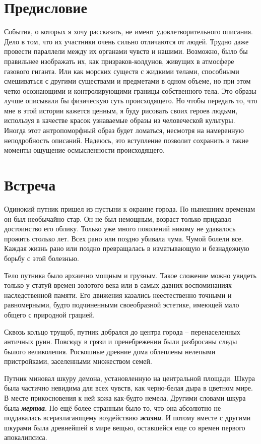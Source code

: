 \documentclass[12pt,a4paper]{article}
\begin{document}
\section*{Предисловие}

События, о которых я хочу рассказать, не имеют удовлетворительного описания. Дело в том, что их участники очень сильно отличаются от людей. Трудно даже провести параллели между их органами чувств и нашими. Возможно, было бы правильнее изображать их, как призраков-колдунов, живущих в атмосфере газового гиганта. Или как морских существ с жидкими телами, способными  смешиваться с другими существами и предметами в одном объеме, но при этом четко осознающими и контролирующими границы собственного тела. Это образы лучше описывали бы физическую суть происходящего. Но чтобы передать то, что мне в этой истории кажется ценным, я буду рисовать своих героев людьми, используя в качестве красок узнаваемые образы из человеческой культуры. Иногда этот антропоморфный образ будет ломаться, несмотря на намеренную неподробность описаний. Надеюсь, это вступление позволит сохранить в такие моменты ощущение осмысленности происходящего.

\section*{Встреча}

Одинокий путник пришел из пустыни к окраине города. По нынешним временам он был необычайно стар. Он не был немощным, возраст только придавал достоинство его облику. Только уже много поколений никому не удавалось прожить столько лет. Всех рано или поздно убивала чума. Чумой болели все. Каждая жизнь рано или поздно превращалась в изматывающую и безнадежную борьбу с этой болезнью.

Тело путника было архаично мощным и грузным. Такое сложение можно увидеть только у статуй времен золотого века или в самых давних воспоминаниях наследственной памяти. Его движения казались неестественно точными и равномерными, будто подчиненными своеобразной эстетике, имеющей мало общего с природной грацией.

Сквозь кольцо трущоб, путник добрался до центра города -- перенаселенных античных руин. Повсюду в грязи и пренебрежении были разбросаны следы былого великолепия. Роскошные древние дома облеплены нелепыми пристройками, заселенными множеством семей.

Путник миновал шкуру демона, установленную на центральной площади. Шкура была частично невидима для всех чувств, как черно-белая дыра в цветном мире. В месте прикосновения к ней кожа как-будто немела. Другими словами шкура была \textbf{\textit{мертва}}. Но ещё более странным было то, что она абсолютно не поддавалась всеразлагающему воздействию \textbf{\textit{жизни}}. И потому вместе с другими шкурами была древнейшей в мире вещью, оставшейся еще со времен первого апокалипсиса.
\end{document}
